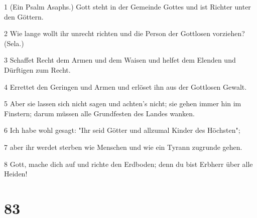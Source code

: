 \par 1 (Ein Psalm Asaphs.) Gott steht in der Gemeinde Gottes und ist Richter unter den Göttern.
\par 2 Wie lange wollt ihr unrecht richten und die Person der Gottlosen vorziehen? (Sela.)
\par 3 Schaffet Recht dem Armen und dem Waisen und helfet dem Elenden und Dürftigen zum Recht.
\par 4 Errettet den Geringen und Armen und erlöset ihn aus der Gottlosen Gewalt.
\par 5 Aber sie lassen sich nicht sagen und achten's nicht; sie gehen immer hin im Finstern; darum müssen alle Grundfesten des Landes wanken.
\par 6 Ich habe wohl gesagt: "Ihr seid Götter und allzumal Kinder des Höchsten";
\par 7 aber ihr werdet sterben wie Menschen und wie ein Tyrann zugrunde gehen.
\par 8 Gott, mache dich auf und richte den Erdboden; denn du bist Erbherr über alle Heiden!

\chapter{83}

